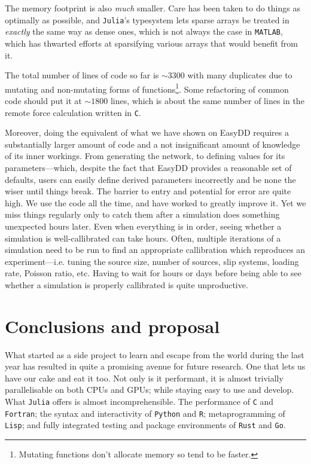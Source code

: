 The memory footprint is also \emph{much} smaller. Care has been taken to do things as optimally as possible, and \texttt{Julia}'s typesystem lets sparse arrays be treated in \emph{exactly} the same way as dense ones, which is not always the case in \texttt{MATLAB}, which has thwarted efforts at sparsifying various arrays that would benefit from it.

The total number of lines of code so far is $\sim 3300$ with many duplicates due to mutating and non-mutating forms of functions\footnote{Mutating functions don't allocate memory so tend to be faster.}. Some refactoring of common code should put it at $\sim 1800$ lines, which is about the same number of lines in the remote force calculation written in \texttt{C}.

Moreover, doing the equivalent of what we have shown on EasyDD requires a substantially larger amount of code and a not insignificant amount of knowledge of its inner workings. From generating the network, to defining values for its parameters---which, despite the fact that EasyDD provides a reasonable set of defaults, users can easily define derived parameters incorrectly and be none the wiser until things break. The barrier to entry and potential for error are quite high. We use the code all the time, and have worked to greatly improve it. Yet we miss things regularly only to catch them after a simulation does something unexpected hours later. Even when everything is in order, seeing whether a simulation is well-callibrated can take hours. Often, multiple iterations of a simulation need to be run to find an appropriate callibration which reproduces an experiment---i.e. tuning the source size, number of sources, slip systems, loading rate, Poisson ratio, etc. Having to wait for hours or days before being able to see whether a simulation is properly callibrated is quite unproductive.

\section{Conclusions and proposal}\label{s:concProp}

What started as a side project to learn and escape from the world during the last year has resulted in quite a promising avenue for future research. One that lets us have our cake and eat it too. Not only is it performant, it is almost trivially parallelisable on both CPUs and GPUs; while staying easy to use and develop. What \texttt{Julia} offers is almost incomprehensible. The performance of \texttt{C} and \texttt{Fortran}; the syntax and interactivity of \texttt{Python} and \texttt{R}; metaprogramming of \texttt{Lisp}; and fully integrated testing and package environments of \texttt{Rust} and \texttt{Go}.

